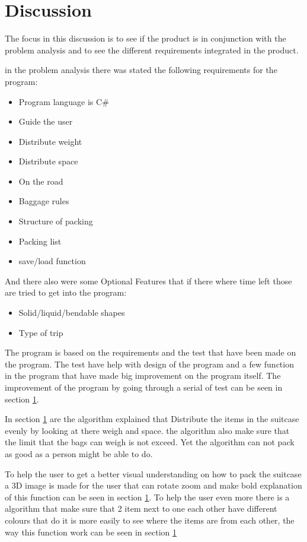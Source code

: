 \section{Discussion}
The focus in this discussion is to see if the product is in conjunction with the problem analysis and to see the different requirements integrated in the product.

in the problem analysis there was stated the following requirements for the program:

\begin{itemize}
\item Program language is C\#
\item Guide the user
\item Distribute weight
\item Distribute space
\item On the road
\item Baggage rules
\item Structure of packing
\item Packing list
\item save/load function
\end{itemize}

And there also were some Optional Features that if there where time left those are tried to get into the program:
\begin{itemize}
\item Solid/liquid/bendable shapes
\item Type of trip
\end{itemize}

The program is based on the requirements and the test that have been made on the program. The test have help with design of the program and a few function in the program that have made big improvement on the program itself. The improvement of the program by going through a serial of test can be seen in section \ref{}.

In section \ref{} are the algorithm explained that Distribute the items in the suitcase evenly by looking at there weigh and space. the algorithm also make sure that the limit that the bags can weigh is not exceed. Yet the algorithm can not pack as good as a person might be able to do.

To help the user to get a better visual understanding on how to pack the suitcase a 3D image is made for the user that can rotate zoom and make bold explanation of this function can be seen in section \ref{}. To help the user even more there is a algorithm that make sure that 2 item next to one each other have different colours that do it is more easily to see where the items are from each other, the way this function work can be seen in section \ref{} 

